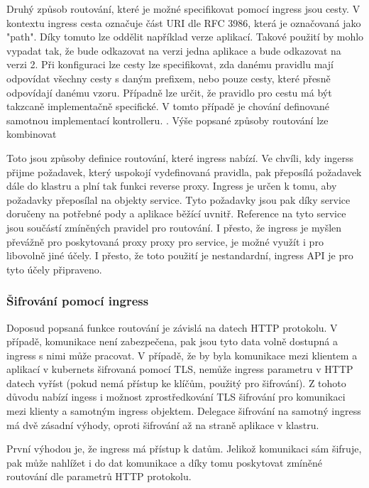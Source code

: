 Druhý způsob routování, které je možné specifikovat pomocí ingress jsou cesty. V kontextu ingress cesta označuje část URI dle RFC 3986, která je označovaná jako "path". Díky tomuto lze oddělit například verze aplikací. Takové použití by mohlo vypadat tak, že  bude odkazovat na verzi jedna aplikace a  bude odkazovat na verzi 2. Při konfiguraci lze cesty lze specifikovat, zda danému pravidlu mají odpovídat všechny cesty s daným prefixem, nebo pouze cesty, které přesně odpovídají danému vzoru. Případně lze určit, že pravidlo pro cestu má být takzcaně implementačně specifické. V tomto případě je chování definované samotnou implementací kontrolleru. \cite{a2022_ingress}. Výše popsané způsoby routování lze kombinovat

Toto jsou způsoby definice routování, které ingress nabízí. Ve chvíli, kdy ingerss přijme požadavek, který uspokojí vydefinovaná pravidla, pak přeposílá požadavek dále do klastru a plní tak funkci reverse proxy. Ingress je určen k tomu, aby požadavky přeposílal na objekty service. Tyto požadavky jsou pak díky service doručeny na potřebné pody a aplikace běžící uvnitř. Reference na tyto service jsou součástí zmíněných pravidel pro routování. I přesto, že ingress je myšlen převážně pro poskytovaná proxy proxy pro service, je možné využít i pro libovolně jiné účely. I přesto, že toto použití je nestandardní, ingress API je pro tyto účely připraveno.   

\subsubsection{Šifrování pomocí ingress}
Doposud popsaná funkce routování je závislá na datech HTTP protokolu. V případě, komunikace není zabezpečena, pak jsou tyto data volně dostupná a ingress s nimi může pracovat. V případě, že by byla komunikace mezi klientem a aplikací v kubernets šifrovaná pomocí TLS, nemůže ingress parametru v HTTP datech vyříst (pokud nemá přístup ke klíčům, použitý pro šifrování). Z tohoto důvodu nabízí ingess i možnost zprostředkování TLS šifrování pro komunikaci mezi klienty a samotným ingress objektem. Delegace šifrování na samotný ingress má dvě zásadní výhody, oproti šifrování až na straně aplikace v klastru. 

První výhodou je, že ingress má přístup k datům. Jelikož komunikaci sám šifruje, pak může nahlížet i do dat komunikace a díky tomu poskytovat zmíněné routování dle parametrů HTTP protokolu.

